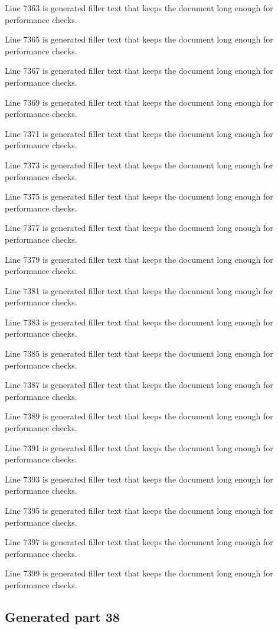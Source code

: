 Line 7363 is generated filler text that keeps the document long enough for performance checks.

Line 7365 is generated filler text that keeps the document long enough for performance checks.

Line 7367 is generated filler text that keeps the document long enough for performance checks.

Line 7369 is generated filler text that keeps the document long enough for performance checks.

Line 7371 is generated filler text that keeps the document long enough for performance checks.

Line 7373 is generated filler text that keeps the document long enough for performance checks.

Line 7375 is generated filler text that keeps the document long enough for performance checks.

Line 7377 is generated filler text that keeps the document long enough for performance checks.

Line 7379 is generated filler text that keeps the document long enough for performance checks.

Line 7381 is generated filler text that keeps the document long enough for performance checks.

Line 7383 is generated filler text that keeps the document long enough for performance checks.

Line 7385 is generated filler text that keeps the document long enough for performance checks.

Line 7387 is generated filler text that keeps the document long enough for performance checks.

Line 7389 is generated filler text that keeps the document long enough for performance checks.

Line 7391 is generated filler text that keeps the document long enough for performance checks.

Line 7393 is generated filler text that keeps the document long enough for performance checks.

Line 7395 is generated filler text that keeps the document long enough for performance checks.

Line 7397 is generated filler text that keeps the document long enough for performance checks.

Line 7399 is generated filler text that keeps the document long enough for performance checks.

\subsection{Generated part 38}

